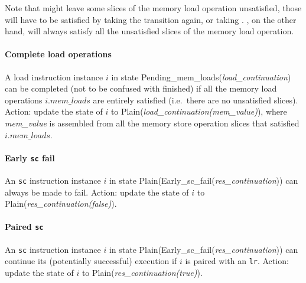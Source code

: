 \begin{commentary}
Note that  might leave some slices of the memory load operation unsatisfied, those will have to be satisfied by taking the transition again, or taking .
, on the other hand, will always satisfy all the unsatisfied slices of the memory load operation.
\end{commentary}


\paragraph{Complete load operations}\label{omm:complete_loads}
A load instruction instance $i$ in state {\sc Pending\_mem\_loads}({\it load\_continuation}) can be completed (not to be confused with finished) if all the memory load operations $i.\textit{mem\_loads}$ are entirely satisfied (i.e.~there are no unsatisfied slices).
Action: update the state of $i$ to {\sc Plain}({\it load\_continuation(mem\_value)}), where {\it mem\_value} is assembled from all the memory store operation slices that satisfied $i.\textit{mem\_loads}$.


\paragraph{Early {\tt sc} fail}\label{omm:early_sc_fail}
An {\tt sc} instruction instance $i$ in state {\sc Plain}({\sc Early\_sc\_fail}({\it res\_continuation})) can always be made to fail.
Action: update the state of $i$ to {\sc Plain}({\it res\_continuation(false)}).


\paragraph{Paired {\tt sc}}\label{omm:paired_sc}
An {\tt sc} instruction instance $i$ in state {\sc Plain}({\sc Early\_sc\_fail}({\it res\_continuation})) can continue its (potentially successful) execution if $i$ is paired with an {\tt lr}.
Action: update the state of $i$ to {\sc Plain}({\it res\_continuation(true)}).


